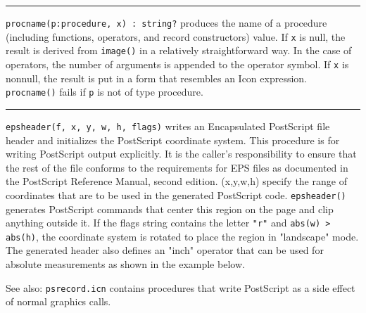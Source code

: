 \vspace{0.25cm}\hrule{}

\texttt{procname(p:procedure, x) : string?} produces the name of a
procedure (including functions, operators, and record
constructors) value. If \texttt{x} is null,
the result is derived from \texttt{image()} in a relatively
straightforward way. In the case of operators, the number of arguments
is appended to the operator symbol. If \texttt{x} is nonnull, the
result is put in a form that resembles an Icon expression.
\texttt{procname()} fails if \texttt{p} is not of type procedure. 

\vspace{0.25cm}\hrule{}

\texttt{epsheader(f, x, y, w, h, flags)} writes an Encapsulated
PostScript file header and initializes the PostScript coordinate
system. This procedure is for writing PostScript output
explicitly.
 It is the caller's
responsibility to ensure that the rest of the file conforms to the
requirements for EPS files as documented in the PostScript Reference
Manual, second edition. (x,y,w,h) specify the range of coordinates that
are to be used in the generated PostScript code. \texttt{epsheader()}
generates PostScript commands that center this region
on the page and clip anything outside it. If the flags string contains
the letter \texttt{"r"} and \texttt{abs(w)
{\textgreater} abs(h)}, the coordinate system is rotated to place the
region in "landscape" mode. The generated
header also defines an "inch" operator that
can be used for absolute measurements as shown in the example below.


See also: \texttt{psrecord.icn} contains procedures that
write PostScript as a side effect of normal graphics calls.

